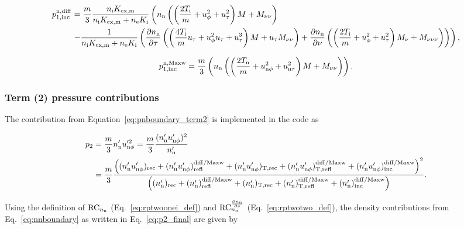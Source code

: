 \begin{align}
    p^{\mathrm{n,diff}}_{\mathrm{1,inc}} & =
    \frac{m}{3} \frac{n_\mathrm{i} K_\mathrm{cx,m}}{n_\mathrm{i} K_\mathrm{cx,m} + n_\mathrm{e} K_\mathrm{i}} \left( n_{\mathrm{n}} \left( \left( \frac{2 T_{\mathrm{i}}}{m} + u_\phi^2 + u_\tau^2 \right) M + M_{\nu \nu} \right) \right. \\ & \left. - \frac{1}{n_\mathrm{i} K_\mathrm{cx,m} + n_\mathrm{e} K_\mathrm{i}} \left( \frac{\partial n_\mathrm{n}}{\partial \tau} \left( \left( \frac{4 T_{\mathrm{i}}}{m} u_\tau + u_\phi^2 u_\tau + u_\tau^3 \right) M + u_\tau M_{\nu \nu} \right) + \frac{\partial n_\mathrm{n}}{\partial \nu} \left( \left( \frac{2 T_{\mathrm{i}}}{m} + u_\phi^2 + u_\tau^2 \right) M_\nu + M_{\nu \nu \nu} \right) \right) \right),
\end{align}

\begin{equation}
    p^{\mathrm{n,Maxw}}_{\mathrm{1,inc}} =
    \frac{m}{3} \left( n_{\mathrm{n}} \left( \left( \frac{2 T_{\mathrm{n}}}{m} + u_{\mathrm{n} \phi}^2 + u_{\mathrm{n} \tau}^2 \right) M + M_{\nu \nu} \right) \right).
\end{equation}

\subsubsection{Term (2) pressure contributions}

The contribution from Equation~\eqref{eq:pnboundary_term2} is implemented in the code as

\begin{align} \label{eq:p2_final}
    p_2 & = \frac{m}{3} n_{\mathrm{n}}' u_{\mathrm{n}\phi}'^{2} =  \frac{m}{3} \frac{(n_{\mathrm{n}}' u_{\mathrm{n}\phi}')^2}{n_{\mathrm{n}}'} \nonumber \\
    & = \frac{m}{3} \frac{\left( (n_{\mathrm{n}}' u_{\mathrm{n}\phi}')_{\mathrm{rec}} + (n_{\mathrm{n}}' u_{\mathrm{n}\phi}')_{\mathrm{refl}}^{\mathrm{diff/Maxw}} + (n_{\mathrm{n}}' u_{\mathrm{n}\phi}')_{\mathrm{T,rec}} + (n_{\mathrm{n}}' u_{\mathrm{n}\phi}')_{\mathrm{T,refl}}^{\mathrm{diff/Maxw}} + (n_{\mathrm{n}}' u_{\mathrm{n}\phi}')_{\mathrm{inc}}^{\mathrm{diff/Maxw}} \right)^2}{\left( (n_{\mathrm{n}}')_{\mathrm{rec}} + (n_{\mathrm{n}}')_{\mathrm{refl}}^{\mathrm{diff/Maxw}} + (n_{\mathrm{n}}')_{\mathrm{T,rec}} + (n_{\mathrm{n}}')_{\mathrm{T,refl}}^{\mathrm{diff/Maxw}} + (n_{\mathrm{n}}')_{\mathrm{inc}}^{\mathrm{diff/Maxw}} \right)}.
\end{align}

Using the definition of $\mathrm{RC}_{n_\mathrm{n}}$ (Eq.~\eqref{eq:rptwoonei_def}) and $\mathrm{RC}_{n_\mathrm{n}}^{\frac{\partial n_\mathrm{n}}{\partial \nu}}$ (Eq.~\eqref{eq:rptwotwo_def}), the density contributions from Eq.~\eqref{eq:nnboundary} as written in Eq.~\eqref{eq:p2_final} are given by

